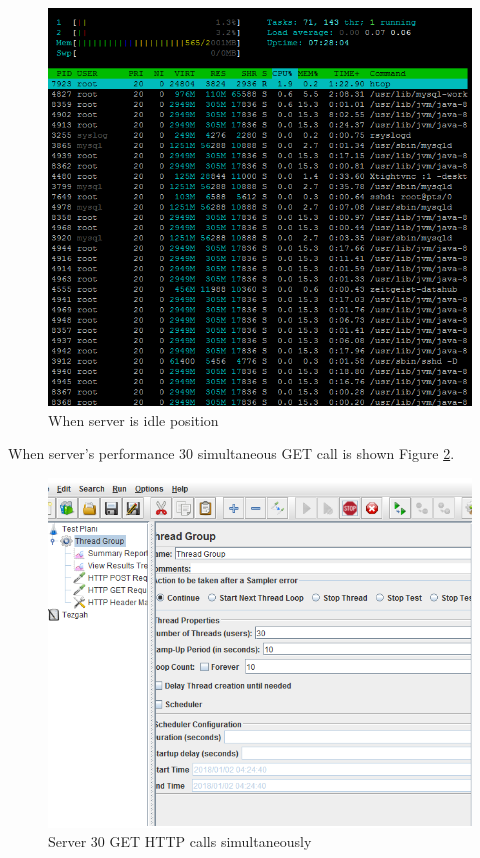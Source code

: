 \begin{figure}[!htbp]
\centering
\includegraphics[width=\textwidth]{projectChapters/images/serveridle.png}
\caption{When server is idle position}
\label{fig:serveridle}
\end{figure}

\newpage

When server's performance 30 simultaneous GET call is shown Figure
\ref{fig:30users}.

\begin{figure}[!htbp]
\centering
\includegraphics[width=\textwidth]{projectChapters/images/30users1.png}
\caption{Server 30 GET HTTP calls simultaneously}
\label{fig:30users}
\end{figure}


